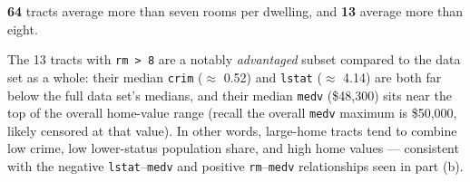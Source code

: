 \documentclass[
  11pt,
]{article}
\begin{document}
\textbf{64} tracts average more than seven rooms per dwelling, and
\textbf{13} average more than eight.

The 13 tracts with \texttt{rm\ \textgreater{}\ 8} are a notably
\emph{advantaged} subset compared to the data set as a whole: their
median \texttt{crim} (\(\approx\) 0.52) and \texttt{lstat} (\(\approx\)
4.14) are both far below the full data set's medians, and their median
\texttt{medv} (\$48,300) sits near the top of the overall home-value
range (recall the overall \texttt{medv} maximum is \$50,000, likely
censored at that value). In other words, large-home tracts tend to
combine low crime, low lower-status population share, and high home
values --- consistent with the negative \texttt{lstat}--\texttt{medv}
and positive \texttt{rm}--\texttt{medv} relationships seen in part (b).
\end{document}
